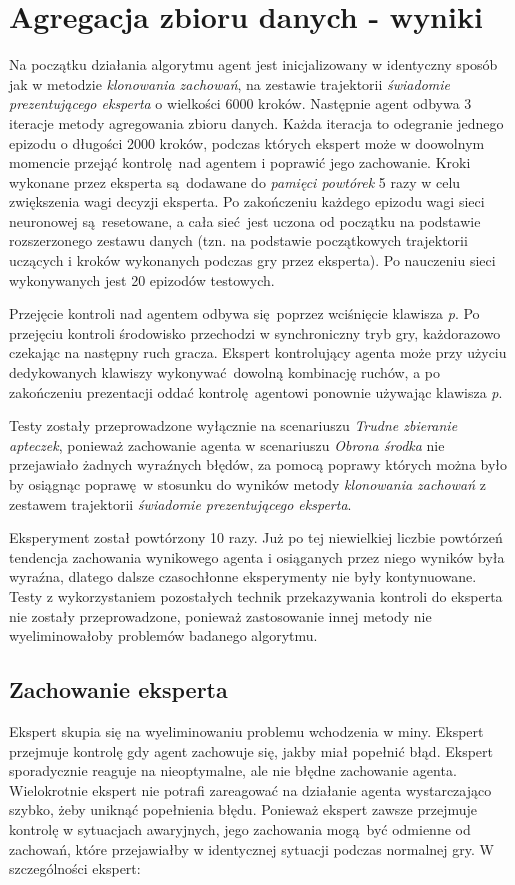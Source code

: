 \section{Agregacja zbioru danych - wyniki}

Na początku działania algorytmu agent jest inicjalizowany w identyczny sposób jak w metodzie \textit{klonowania zachowań}, na zestawie trajektorii \textit{świadomie prezentującego eksperta} o wielkości 6000 kroków. Następnie agent odbywa 3 iteracje metody agregowania zbioru danych. Każda iteracja to odegranie jednego epizodu o długości 2000 kroków, podczas których ekspert może w doowolnym momencie przejąć kontrolę nad agentem i poprawić jego zachowanie. Kroki wykonane przez eksperta są dodawane do \textit{pamięci powtórek} 5 razy w celu zwiększenia wagi decyzji eksperta. Po zakończeniu każdego epizodu wagi sieci neuronowej są resetowane, a cała sieć jest uczona od początku na podstawie rozszerzonego zestawu danych (tzn. na podstawie początkowych trajektorii uczących i kroków wykonanych podczas gry przez eksperta). Po nauczeniu sieci wykonywanych jest 20 epizodów testowych.

Przejęcie kontroli nad agentem odbywa się poprzez wciśnięcie klawisza \textit{p}. Po przejęciu kontroli środowisko przechodzi w synchroniczny tryb gry, każdorazowo czekając na następny ruch gracza. Ekspert kontrolujący agenta może przy użyciu dedykowanych klawiszy wykonywać dowolną kombinację ruchów, a po zakończeniu prezentacji oddać kontrolę agentowi ponownie używając klawisza \textit{p}.

Testy zostały przeprowadzone wyłącznie na scenariuszu \textit{Trudne zbieranie apteczek}, ponieważ zachowanie agenta w scenariuszu \textit{Obrona środka} nie przejawiało żadnych wyraźnych błędów, za pomocą poprawy których można było by osiągnąc poprawę w stosunku do wyników metody \textit{klonowania zachowań} z zestawem trajektorii \textit{świadomie prezentującego eksperta}.

Eksperyment został powtórzony 10 razy. Już po tej niewielkiej liczbie powtórzeń tendencja zachowania wynikowego agenta i osiąganych przez niego wyników była wyraźna, dlatego dalsze czasochłonne eksperymenty nie były kontynuowane. Testy z wykorzystaniem pozostałych technik przekazywania kontroli do eksperta nie zostały przeprowadzone, ponieważ zastosowanie innej metody nie wyeliminowałoby problemów badanego algorytmu.

\subsection {Zachowanie eksperta}
Ekspert skupia się na wyeliminowaniu problemu wchodzenia w miny. Ekspert przejmuje kontrolę gdy agent zachowuje się, jakby miał popełnić błąd. Ekspert sporadycznie reaguje na nieoptymalne, ale nie błędne zachowanie agenta. Wielokrotnie ekspert nie potrafi zareagować na działanie agenta wystarczająco szybko, żeby uniknąć popełnienia błędu. Ponieważ ekspert zawsze przejmuje kontrolę w sytuacjach awaryjnych, jego zachowania mogą być odmienne od zachowań, które przejawiałby w identycznej sytuacji podczas normalnej gry. W szczególności ekspert:

